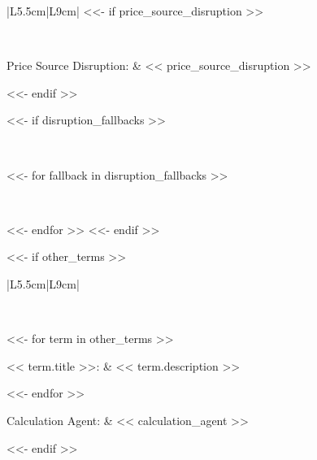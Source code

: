 \documentclass[11pt,a4paper]{article}
\begin{document}
\begin{longtable}{|L{5.5cm}|L{9cm}|}
<<- if price_source_disruption >>

 \\
\hline

\quad Price Source Disruption:
& << price_source_disruption >> \\
\hline

<<- endif >>

<<- if disruption_fallbacks >>

 \\
\hline

<<- for fallback in disruption_fallbacks >>

 \\
\hline

<<- endfor >>
<<- endif >>

\end{longtable}

\newpage

<<- if other_terms >>

\begin{longtable}{|L{5.5cm}|L{9cm}|}
\hline

 \\
\hline

<<- for term in other_terms >>

\quad << term.title >>:
& << term.description >> \\
\hline

<<- endfor >>

\quad Calculation Agent:
& << calculation_agent >> \\
\hline

\end{longtable}

<<- endif >>
\end{document}
